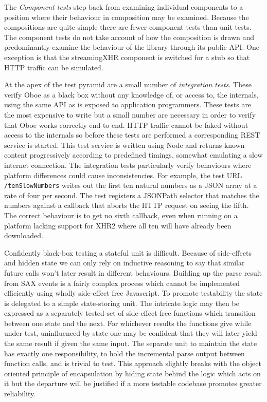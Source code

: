 \documentclass[12pt, ]{article}
\begin{document}
The \emph{Component tests} step back from examining individual
components to a position where their behaviour in composition may be
examined. Because the compositions are quite simple there are fewer
component tests than unit tests. The component tests do not take account
of how the composition is drawn and predominantly examine the behaviour
of the library through its public API. One exception is that the
streamingXHR component is switched for a stub so that HTTP traffic can
be simulated.

At the apex of the test pyramid are a small number of \emph{integration
tests}. These verify Oboe as a black box without any knowledge of, or
access to, the internals, using the same API as is exposed to
application programmers. These tests are the most expensive to write but
a small number are necessary in order to verify that Oboe works
correctly end-to-end. HTTP traffic cannot be faked without access to the
internals so before these tests are performed a corresponding REST
service is started. This test service is written using Node and returns
known content progressively according to predefined timings, somewhat
emulating a slow internet connection. The integration tests particularly
verify behaviours where platform differences could cause
inconsistencies. For example, the test URL \texttt{/tenSlowNumbers}
writes out the first ten natural numbers as a JSON array at a rate of
four per second. The test registers a JSONPath selector that matches the
numbers against a callback that aborts the HTTP request on seeing the
fifth. The correct behaviour is to get no sixth callback, even when
running on a platform lacking support for XHR2 where all ten will have
already been downloaded.

Confidently black-box testing a stateful unit is difficult. Because of
side-effects and hidden state we can only rely on inductive reasoning to
say that similar future calls won't later result in different
behaviours. Building up the parse result from SAX events is a fairly
complex process which cannot be implemented efficiently using wholly
side-effect free Javascript. To promote testability the state is
delegated to a simple state-storing unit. The intricate logic may then
be expressed as a separately tested set of side-effect free functions
which transition between one state and the next. For whichever results
the functions give while under test, uninfluenced by state one may be
confident that they will later yield the same result if given the same
input. The separate unit to maintain the state has exactly one
responsibility, to hold the incremental parse output between function
calls, and is trivial to test. This approach slightly breaks with the
object oriented principle of encapsulation by hiding state behind the
logic which acts on it but the departure will be justified if a more
testable codebase promotes greater reliability.
\end{document}
